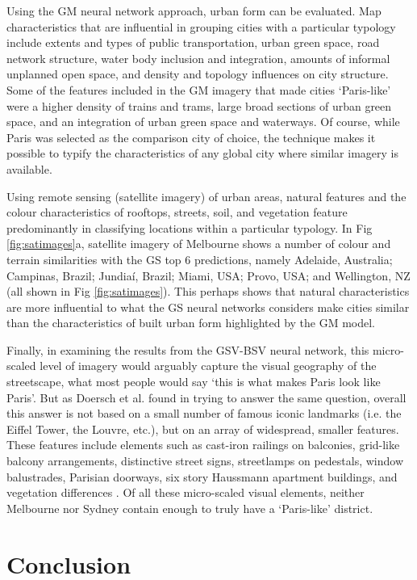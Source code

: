 \documentclass[10pt,letterpaper]{article}
\begin{document}
Using the GM neural network approach, urban form can be evaluated. Map characteristics that are influential in grouping cities with a particular typology include extents and types of public transportation, urban green space, road network structure, water body inclusion and integration, amounts of informal unplanned open space, and density and topology influences on city structure. Some of the features included in the GM imagery that made cities `Paris-like' were a higher density of trains and trams, large broad sections of urban green space, and an integration of urban green space and waterways. Of course, while Paris was selected as the comparison city of choice, the technique makes it possible to typify the characteristics of any global city where similar imagery is available.

Using remote sensing (satellite imagery) of urban areas, natural features and the colour characteristics of rooftops, streets, soil, and vegetation feature predominantly in classifying locations within a particular typology. In Fig \ref{fig:satimages}a, satellite imagery of Melbourne shows a number of colour and terrain similarities with the GS top 6 predictions, namely Adelaide, Australia; Campinas, Brazil; Jundia\'{i}, Brazil; Miami, USA; Provo, USA; and Wellington, NZ (all shown in Fig \ref{fig:satimages}). This perhaps shows that natural characteristics are more influential to what the GS neural networks considers make cities similar than the characteristics of built urban form highlighted by the GM model.

Finally, in examining the results from the GSV-BSV neural network, this micro-scaled level of imagery would arguably capture the visual geography of the streetscape, what most people would say `this is what makes Paris look like Paris'. But as Doersch et al. \cite{Doersch2012} found in trying to answer the same question, overall this answer is not based on a small number of famous iconic landmarks (i.e. the Eiffel Tower, the Louvre, etc.), but on an array of widespread, smaller features. These features include elements such as cast-iron railings on balconies, grid-like balcony arrangements, distinctive street signs, streetlamps on pedestals, window balustrades, Parisian doorways,  six story Haussmann apartment buildings, and vegetation differences \cite{Li2015}. Of all these micro-scaled visual elements, neither Melbourne nor Sydney contain enough to truly have a `Paris-like' district.

\section*{Conclusion}\label{sec:conclusion}
\end{document}
